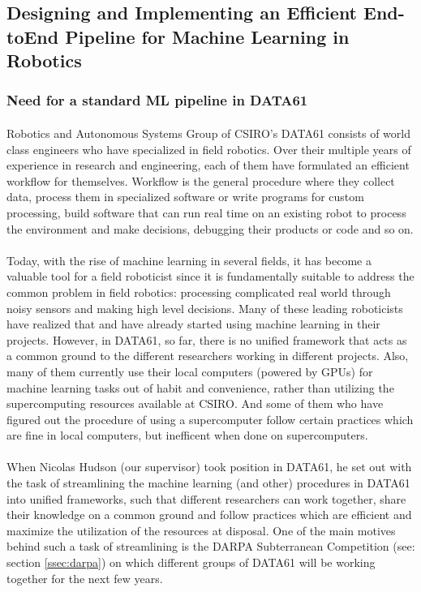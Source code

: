 
\newpage
\subsection{Designing and Implementing an Efficient End-toEnd Pipeline for Machine Learning in Robotics}

\subsubsection{Need for a standard ML pipeline in DATA61}

\paragraph{}
Robotics and Autonomous Systems Group of CSIRO's DATA61 consists of world class engineers who have specialized in field robotics. Over their multiple years of experience in research and engineering, each of them have formulated an efficient workflow for themselves. Workflow is the general procedure where they collect data, process them in specialized software or write programs for custom processing, build software that can run real time on an existing robot to process the environment and make decisions, debugging their products or code and so on. 

\paragraph{}
Today, with the rise of machine learning in several fields, it has become a valuable tool for a field roboticist since it is fundamentally suitable to address the common problem in field robotics: processing complicated real world through noisy sensors and making high level decisions. Many of these leading roboticists have realized that and have already started using machine learning in their projects. However, in DATA61, so far, there is no unified framework that acts as a common ground to the different researchers working in different projects. Also, many of them currently use their local computers (powered by GPUs) for machine learning tasks out of habit and convenience, rather than utilizing the supercomputing resources available at CSIRO. And some of them who have figured out the procedure of using a supercomputer follow certain practices which are fine in local computers, but inefficent when done on supercomputers.

\paragraph{}
When Nicolas Hudson (our supervisor) took position in DATA61, he set out with the task of streamlining the machine learning (and other) procedures in DATA61 into unified frameworks, such that different researchers can work together, share their knowledge on a common ground and follow practices which are efficient and maximize the utilization of the resources at disposal. One of the main motives behind such a task of streamlining is the DARPA Subterranean Competition (see: section \ref{ssec:darpa}) on which different groups of DATA61 will be working together for the next few years. 

